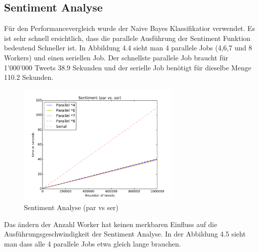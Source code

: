 \documentclass[12pt, oneside]{report}   	%
\begin{document}
\subsection{Sentiment Analyse}
Für den Performancevergleich wurde der Naive Bayes  Klassifikatior verwendet. Es ist sehr schnell ersichtlich, dass die parallele Ausführung der Sentiment Funktion bedeutend Schneller ist. In Abbildung 4.4 sieht man 4 parallele Jobs (4,6,7 und 8 Workers) und einen seriellen Job. Der schnellste parallele Job braucht für 1'000'000 Tweets 38.9 Sekunden und der serielle Job benötigt für dieselbe Menge 110.2 Sekunden. 

\begin{figure}[h!]
\begin{center}
\includegraphics[width=0.7\textwidth]{bilder/time_senitment_par-ser.pdf}
\caption{Sentiment Analyse (par vs ser)}
\label{img:performancesentiment}
\end{center}
\end{figure}


Das ändern der Anzahl Worker hat keinen merkbaren Einfluss auf die Ausführungsgeschwindigkeit der Sentiment Analyse. In der Abbildung 4.5 sieht man dass alle 4 parallele Jobs etwa gleich lange brauchen.
\end{document}
